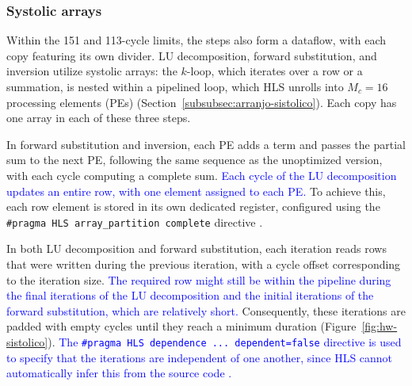 \subsubsection{\texorpdfstring{Systolic arrays}{Systolic arrays}}\label{subsubsec:hw-sistolico}

Within the 151 and 113-cycle limits, the steps also form a dataflow, with each copy featuring its own divider. LU decomposition, forward substitution, and inversion utilize systolic arrays: the $k$-loop, which iterates over a row or a summation, is nested within a pipelined loop, which HLS unrolls into $M_c = 16$ processing elements (PEs) (Section~\ref{subsubsec:arranjo-sistolico}). Each copy has one array in each of these three steps.

In forward substitution and inversion, each PE adds a term and passes the partial sum to the next PE, following the same sequence as the unoptimized version, with each cycle computing a complete sum. \textcolor{blue}{Each cycle of the LU decomposition updates an entire row, with one element assigned to each PE.} To achieve this, each row element is stored in its own dedicated register, configured using the \texttt{\#pragma HLS array\_partition complete} directive \cite[p.~87]{kastner-hls}.

In both LU decomposition and forward substitution, each iteration reads rows that were written during the previous iteration, with a cycle offset corresponding to the iteration size. \textcolor{blue}{The required row might still be within the pipeline during the final iterations of the LU decomposition and the initial iterations of the forward substitution, which are relatively short.} Consequently, these iterations are padded with empty cycles until they reach a minimum duration (Figure~\ref{fig:hw-sistolico}). \textcolor{blue}{The \texttt{\#pragma HLS dependence ... dependent=false} directive is used to specify that the iterations are independent of one another, since HLS cannot automatically infer this from the source code \cite[p.~149]{kastner-hls}.}


